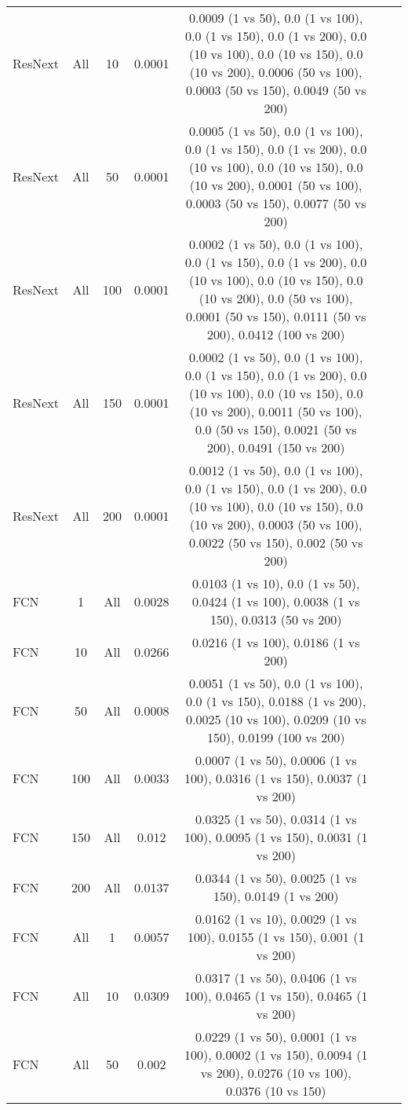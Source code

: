 \begin{table}[ht]
\begin{tabular}{|l|c|c|c|c|c|c|}
ResNext & All & 10 & 0.0001 & 0.0009 (1 vs 50), 0.0 (1 vs 100), 0.0 (1 vs 150), 0.0 (1 vs 200), 0.0 (10 vs 100), 0.0 (10 vs 150), 0.0 (10 vs 200), 0.0006 (50 vs 100), 0.0003 (50 vs 150), 0.0049 (50 vs 200) \\ 
ResNext & All & 50 & 0.0001 & 0.0005 (1 vs 50), 0.0 (1 vs 100), 0.0 (1 vs 150), 0.0 (1 vs 200), 0.0 (10 vs 100), 0.0 (10 vs 150), 0.0 (10 vs 200), 0.0001 (50 vs 100), 0.0003 (50 vs 150), 0.0077 (50 vs 200) \\ 
ResNext & All & 100 & 0.0001 & 0.0002 (1 vs 50), 0.0 (1 vs 100), 0.0 (1 vs 150), 0.0 (1 vs 200), 0.0 (10 vs 100), 0.0 (10 vs 150), 0.0 (10 vs 200), 0.0 (50 vs 100), 0.0001 (50 vs 150), 0.0111 (50 vs 200), 0.0412 (100 vs 200) \\ 
ResNext & All & 150 & 0.0001 & 0.0002 (1 vs 50), 0.0 (1 vs 100), 0.0 (1 vs 150), 0.0 (1 vs 200), 0.0 (10 vs 100), 0.0 (10 vs 150), 0.0 (10 vs 200), 0.0011 (50 vs 100), 0.0 (50 vs 150), 0.0021 (50 vs 200), 0.0491 (150 vs 200) \\ 
ResNext & All & 200 & 0.0001 & 0.0012 (1 vs 50), 0.0 (1 vs 100), 0.0 (1 vs 150), 0.0 (1 vs 200), 0.0 (10 vs 100), 0.0 (10 vs 150), 0.0 (10 vs 200), 0.0003 (50 vs 100), 0.0022 (50 vs 150), 0.002 (50 vs 200) \\ 
FCN & 1 & All & 0.0028 & 0.0103 (1 vs 10), 0.0 (1 vs 50), 0.0424 (1 vs 100), 0.0038 (1 vs 150), 0.0313 (50 vs 200) \\ 
FCN & 10 & All & 0.0266 & 0.0216 (1 vs 100), 0.0186 (1 vs 200) \\ 
FCN & 50 & All & 0.0008 & 0.0051 (1 vs 50), 0.0 (1 vs 100), 0.0 (1 vs 150), 0.0188 (1 vs 200), 0.0025 (10 vs 100), 0.0209 (10 vs 150), 0.0199 (100 vs 200) \\ 
FCN & 100 & All & 0.0033 & 0.0007 (1 vs 50), 0.0006 (1 vs 100), 0.0316 (1 vs 150), 0.0037 (1 vs 200) \\ 
FCN & 150 & All & 0.012 & 0.0325 (1 vs 50), 0.0314 (1 vs 100), 0.0095 (1 vs 150), 0.0031 (1 vs 200) \\ 
FCN & 200 & All & 0.0137 & 0.0344 (1 vs 50), 0.0025 (1 vs 150), 0.0149 (1 vs 200) \\ 
FCN & All & 1 & 0.0057 & 0.0162 (1 vs 10), 0.0029 (1 vs 100), 0.0155 (1 vs 150), 0.001 (1 vs 200) \\ 
FCN & All & 10 & 0.0309 & 0.0317 (1 vs 50), 0.0406 (1 vs 100), 0.0465 (1 vs 150), 0.0465 (1 vs 200) \\ 
FCN & All & 50 & 0.002 & 0.0229 (1 vs 50), 0.0001 (1 vs 100), 0.0002 (1 vs 150), 0.0094 (1 vs 200), 0.0276 (10 vs 100), 0.0376 (10 vs 150) \\ 

\end{tabular}
\end{table}
